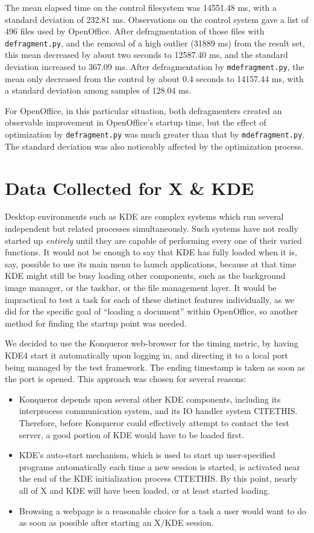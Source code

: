 \documentclass[10pt,twocolumn,letterpaper]{article}
\begin{document}
The mean elapsed time on the control filesystem was 14551.48 ms, with a standard deviation of 232.81 ms. Observations on the control system gave a list of 496 files used by OpenOffice. After
defragmentation of those files with \texttt{defragment.py}, and the removal of a high outlier (31889 ms) from the result set, this mean decreased by about two seconds to 12587.40 ms, and the standard deviation increased to 367.09 ms. After defragmentation by \texttt{mdefragment.py}, the mean only decreased from the control by about 0.4 seconds to 14157.44 ms, with a standard deviation among samples of 128.04 ms.

For OpenOffice, in this particular situation, both defragmenters created an observable improvement in OpenOffice's startup time, but the effect of optimization by \texttt{defragment.py} was much greater than that by \texttt{mdefragment.py}. The standard deviation was also noticeably affected by the optimization process.

\section{Data Collected for X \& KDE}\label{sec:kderesults}

Desktop environments such as KDE are complex systems which run several independent but related processes simultaneously. Such systems have not really started up \emph{entirely} until they are capable of performing every one of their varied functions. It would not be enough to say that KDE has fully loaded when it is, say, possible to use its main menu to launch applications, because at that time KDE might still be busy loading other components, such as the background image manager, or the taskbar, or the file management layer. It would be impractical to test a task for each of these distinct features individually, as we did for the specific goal of ``loading a document'' within OpenOffice, so another method for finding the startup point was needed.

We decided to use the Konqueror web-browser for the timing metric, by having KDE4 start it automatically upon logging in, and directing it to a local port being managed by the test framework. The ending timestamp is taken as soon as the port is opened. This approach was chosen for several reasons:
\begin{itemize}
\item Konqueror depends upon several other KDE components, including its interprocess communication system, and its IO handler system CITETHIS. Therefore, before Konqueror could effectively attempt to contact the test server, a good portion of KDE would have to be loaded first.
\item KDE's auto-start mechanism, which is used to start up user-specified programs automatically each time a new session is started, is activated near the end of the KDE initialization process CITETHIS. By this point, nearly all of X and KDE will have been loaded, or at least started loading.
\item Browsing a webpage is a reasonable choice for a task a user would want to do as soon as possible after starting an X/KDE session. 
\end{itemize}
\end{document}
